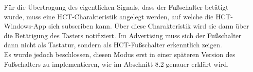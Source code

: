Für die Übertragung des eigentlichen Signals, dass der Fußschalter betätigt wurde, muss eine \ac{HCT}-Charakteristik angelegt werden, auf welche die \ac{HCT}-Windows-App sich subscriben kann. Über diese Charakteristik wird sie dann über die Betätigung des Tasters notifiziert. Im Advertising muss sich der Fußschalter dann nicht als Tastatur, sondern als \ac{HCT}-Fußschalter erkenntlich zeigen.\\
Es wurde jedoch beschlossen, diesen Modus erst in einer späteren Version des Fußschalters zu implementieren, wie im Abschnitt 8.2 genauer erklärt wird.